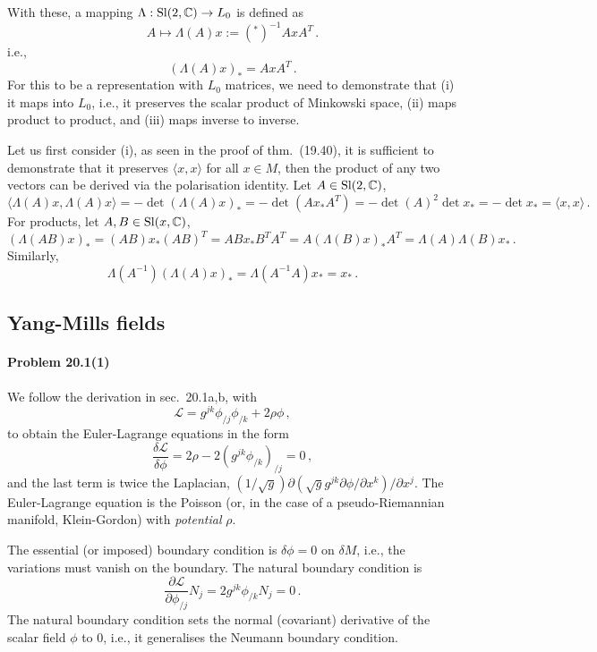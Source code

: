 \documentclass[a4paper,12pt]{article}
\newcommand{\problem}[1]{\paragraph{Problem #1}}
\begin{document}
With these, a mapping $\Lambda : {\rm Sl}(2, \mathbb{C}) \to L_0$ is defined as
\[
 A \mapsto \Lambda(A)x := ({}^*)^{-1} AxA^T\,.
\]
i.e.,
\[
 (\Lambda(A)x)_* = AxA^T\,.
\]
For this to be a representation with $L_0$ matrices, we need to demonstrate that (i) it maps into $L_0$, i.e., it preserves the scalar product of Minkowski space, (ii) maps product to product, and (iii) maps inverse to inverse.

Let us first consider (i), as seen in the proof of thm.\ (19.40), it is sufficient to demonstrate that it preserves $\langle x, x\rangle$ for all $x\in M$, then the product of any two vectors can be derived via the polarisation identity. Let $A\in {\rm Sl}(2, \mathbb{C})$,
\[
 \langle \Lambda(A) x, \Lambda(A)x\rangle = -\det (\Lambda(A)x)_* = - \det( A x_* A^T) = -\det(A)^2 \det x_* = -\det x_* = \langle x, x \rangle\,.
\]
For products, let $A, B \in {\rm Sl}(x, \mathbb{C})$,
\[
 (\Lambda(AB)x)_* = (AB)x_* (AB)^T = A B x_* B^T A^T = A (\Lambda(B) x)_* A^T= \Lambda(A)\Lambda(B) x_*\,.
\]
Similarly,
\[
 \Lambda(A^{-1}) (\Lambda(A)x)_* = \Lambda(A^{-1}A)x_* = x_*\,.
\]


\subsection{Yang-Mills fields}


\problem{20.1(1)} We follow the derivation in sec.\ 20.1a,b, with
\[
 \mathcal{L} = g^{jk}\phi_{/j}\phi_{/k}+2\rho\phi\,,
\]
to obtain the Euler-Lagrange equations in the form
\[
 \frac{\delta\mathcal{L}}{\delta \phi} = 2\rho - 2(g^{jk}\phi_{/k})_{/j} = 0\,,
\]
and the last term is twice the Laplacian, $(1/\sqrt{g})\partial(\sqrt{g}g^{jk}\partial\phi/\partial x^k)/\partial x^j$. The Euler-Lagrange equation is the Poisson (or, in the case of a pseudo-Riemannian manifold, Klein-Gordon) with {\sl potential}\/ $\rho$.

The essential (or imposed) boundary condition is $\delta\phi=0$ on $\delta M$, i.e., the variations must vanish on the boundary. The natural boundary condition is
\[
 \frac{\partial\mathcal{L}}{\partial \phi_{/j}}N_j = 2 g^{jk}\phi_{/k} N_j = 0\,.
\]
The natural boundary condition sets the normal (covariant) derivative of the scalar field $\phi$ to 0, i.e., it generalises the Neumann boundary condition.
\end{document}
